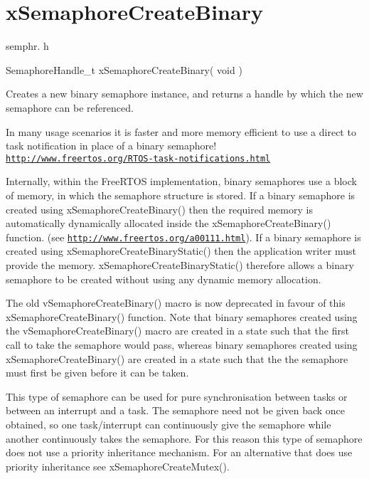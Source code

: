 \hypertarget{group__xSemaphoreCreateBinary}{}\section{x\+Semaphore\+Create\+Binary}
\label{group__xSemaphoreCreateBinary}
semphr. h 
\begin{DoxyPre}SemaphoreHandle\_t xSemaphoreCreateBinary( void )\end{DoxyPre}


Creates a new binary semaphore instance, and returns a handle by which the new semaphore can be referenced.

In many usage scenarios it is faster and more memory efficient to use a direct to task notification in place of a binary semaphore! \href{http://www.freertos.org/RTOS-task-notifications.html}{\tt http\+://www.\+freertos.\+org/\+R\+T\+O\+S-\/task-\/notifications.\+html}

Internally, within the Free\+R\+T\+OS implementation, binary semaphores use a block of memory, in which the semaphore structure is stored. If a binary semaphore is created using x\+Semaphore\+Create\+Binary() then the required memory is automatically dynamically allocated inside the x\+Semaphore\+Create\+Binary() function. (see \href{http://www.freertos.org/a00111.html}{\tt http\+://www.\+freertos.\+org/a00111.\+html}). If a binary semaphore is created using x\+Semaphore\+Create\+Binary\+Static() then the application writer must provide the memory. x\+Semaphore\+Create\+Binary\+Static() therefore allows a binary semaphore to be created without using any dynamic memory allocation.

The old v\+Semaphore\+Create\+Binary() macro is now deprecated in favour of this x\+Semaphore\+Create\+Binary() function. Note that binary semaphores created using the v\+Semaphore\+Create\+Binary() macro are created in a state such that the first call to \textquotesingle{}take\textquotesingle{} the semaphore would pass, whereas binary semaphores created using x\+Semaphore\+Create\+Binary() are created in a state such that the the semaphore must first be \textquotesingle{}given\textquotesingle{} before it can be \textquotesingle{}taken\textquotesingle{}.

This type of semaphore can be used for pure synchronisation between tasks or between an interrupt and a task. The semaphore need not be given back once obtained, so one task/interrupt can continuously \textquotesingle{}give\textquotesingle{} the semaphore while another continuously \textquotesingle{}takes\textquotesingle{} the semaphore. For this reason this type of semaphore does not use a priority inheritance mechanism. For an alternative that does use priority inheritance see x\+Semaphore\+Create\+Mutex().

